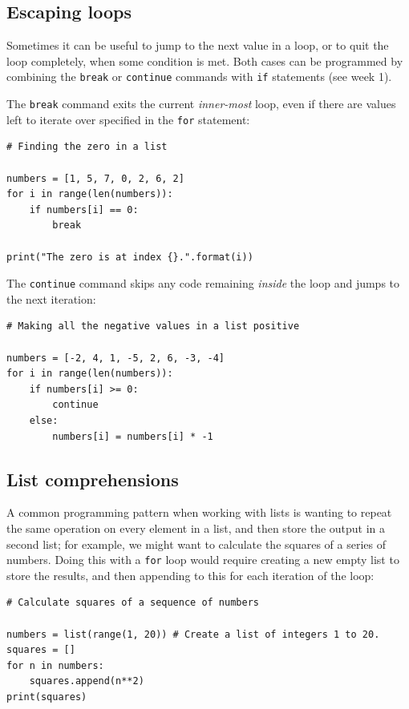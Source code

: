 \documentclass[a4paper]{article}
\begin{document}
\subsection{Escaping loops}
Sometimes it can be useful to jump to the next value in a loop, or to quit the loop completely, when some condition is met. Both cases can be programmed by combining the \texttt{break} or \texttt{continue} commands with \texttt{if} statements (see week 1).

The \texttt{break} command exits the current \emph{inner-most} loop, even if there are values left to iterate over specified in the \texttt{for} statement:
\begin{lstlisting}
# Finding the zero in a list

numbers = [1, 5, 7, 0, 2, 6, 2]
for i in range(len(numbers)):
	if numbers[i] == 0:
		break

print("The zero is at index {}.".format(i))
\end{lstlisting}

The \texttt{continue} command skips any code remaining \emph{inside} the loop and jumps to the next iteration:
\begin{lstlisting}
# Making all the negative values in a list positive

numbers = [-2, 4, 1, -5, 2, 6, -3, -4]
for i in range(len(numbers)):
	if numbers[i] >= 0:
		continue
	else:
		numbers[i] = numbers[i] * -1
\end{lstlisting}

\subsection{List comprehensions}
A common programming pattern when working with lists is wanting to repeat the same operation on every element in a list, and then store the output in a second list; for example, we might want to calculate the squares of a series of numbers. Doing this with a \texttt{for} loop would require creating a new empty list to store the results, and then appending to this for each iteration of the loop:
\begin{lstlisting}
# Calculate squares of a sequence of numbers

numbers = list(range(1, 20)) # Create a list of integers 1 to 20.
squares = []
for n in numbers:
    squares.append(n**2)
print(squares)
\end{lstlisting}
\end{document}
